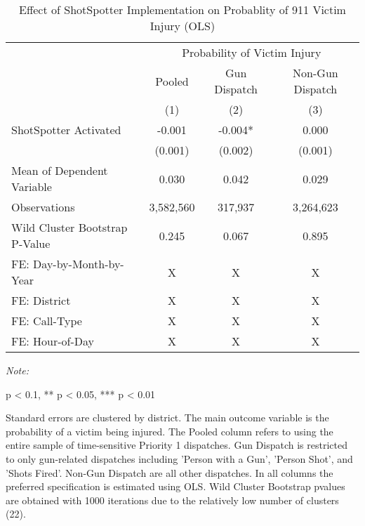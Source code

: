 \begin{table}[H]

\caption{\label{victim_table}Effect of ShotSpotter Implementation on Probablity of 911 Victim Injury (OLS)}
\centering
\begin{threeparttable}
\fontsize{11}{13}\selectfont
\begin{tabular}[t]{>{\raggedright\arraybackslash}p{8cm}ccc}
\toprule
\multicolumn{1}{c}{ } & \multicolumn{3}{c}{Probability of Victim Injury} \\
\cmidrule(l{3pt}r{3pt}){2-4}
\multicolumn{1}{c}{ } & \multicolumn{1}{c}{Pooled} & \multicolumn{1}{c}{Gun Dispatch} & \multicolumn{1}{c}{Non-Gun Dispatch} \\
\cmidrule(l{3pt}r{3pt}){2-2} \cmidrule(l{3pt}r{3pt}){3-3} \cmidrule(l{3pt}r{3pt}){4-4}
  & (1) & (2) & (3)\\
\midrule
ShotSpotter Activated & -0.001 & -0.004* & 0.000\\
 & (0.001) & (0.002) & (0.001)\\
Mean of Dependent Variable & 0.030 & 0.042 & 0.029\\
Observations & 3,582,560 & 317,937 & 3,264,623\\
Wild Cluster Bootstrap P-Value & 0.245 & 0.067 & 0.895\\
\midrule
\addlinespace
FE: Day-by-Month-by-Year & X & X & X\\
FE: District & X & X & X\\
FE: Call-Type & X & X & X\\
FE: Hour-of-Day & X & X & X\\
\bottomrule
\end{tabular}
\begin{tablenotes}
\item \textit{Note: } 
\item * p < 0.1, ** p < 0.05, *** p < 0.01
\item Standard errors are clustered by district.                       The main outcome variable is the probability of a victim being                      injured.                      The Pooled column refers to using the entire sample of time-sensitive Priority 1                      dispatches.                      Gun Dispatch is restricted to only gun-related dispatches including                      'Person with a Gun', 'Person Shot', and 'Shots Fired'. Non-Gun Dispatch are all other                      dispatches. In all columns the preferred specification is estimated using                      OLS. Wild Cluster Bootstrap pvalues are obtained with 1000 iterations due to the relatively                      low number of clusters (22).                                    
\end{tablenotes}
\end{threeparttable}
\end{table}
